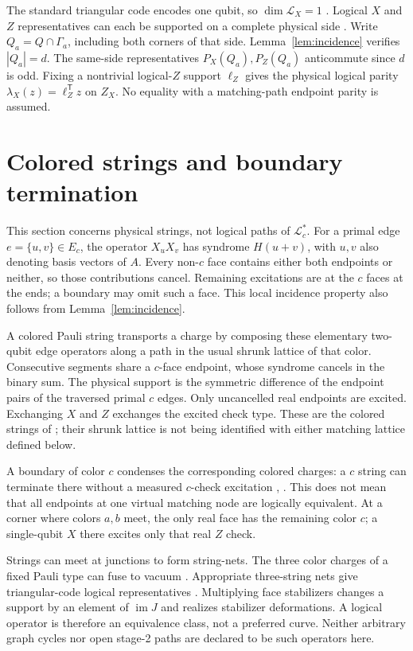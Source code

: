 \documentclass[11pt]{article}
\theoremstyle{definition}
\theoremstyle{plain}
\theoremstyle{remark}
\newcommand{\LL}{\mathcal L}
\begin{document}
The standard triangular code encodes one qubit, so $\dim\LL_X=1$
\cite[triangular-code construction, pp.~2--3]{Bombin}.
Logical $X$ and $Z$ representatives can each be supported on a complete
physical side \cite[Sec.~2.1, p.~4]{Lee}.
Write $Q_a=Q\cap\Gamma_a$, including both corners of that side.
Lemma~\ref{lem:incidence} verifies $|Q_a|=d$.
The same-side representatives $P_X(Q_a),P_Z(Q_a)$ anticommute since
$d$ is odd. Fixing a nontrivial logical-$Z$ support $\ell_Z$ gives
the physical logical parity $\lambda_X(z)=\ell_Z^{\mathsf T}z$ on
$Z_X$. No equality with a matching-path endpoint parity is assumed.

\section{Colored strings and boundary termination}\label{sec:strings}
This section concerns physical strings, not logical paths of $\LL_c^*$.
For a primal edge $e=\{u,v\}\in E_c$, the operator $X_uX_v$ has syndrome
$H(u+v)$, with $u,v$ also denoting basis vectors of $A$.
Every non-$c$ face contains either both endpoints or neither, so those
contributions cancel. Remaining excitations are at the $c$ faces at the
ends; a boundary may omit such a face. This local incidence property
also follows from Lemma~\ref{lem:incidence}.

A colored Pauli string transports a charge by composing these elementary
two-qubit edge operators along a path in the usual shrunk lattice of that
color. Consecutive segments share a $c$-face endpoint, whose syndrome
cancels in the binary sum. The physical support is the symmetric
difference of the endpoint pairs of the traversed primal $c$ edges.
Only uncancelled real endpoints are excited. Exchanging $X$ and $Z$
exchanges the excited check type. These are the colored strings of
\cite[Eq.~(4), pp.~2--3]{Bombin}; their shrunk lattice is not being
identified with either matching lattice defined below.

A boundary of color $c$ condenses the corresponding colored charges:
a $c$ string can terminate there without a measured $c$-check excitation
\cite[boundary discussion, p.~3]{Bombin},
\cite[Secs.~4.2--4.3, Fig.~6 and Table~2]{Kesselring}.
This does not mean that all endpoints at one virtual matching node are
logically equivalent. At a corner where colors $a,b$ meet, the only real
face has the remaining color $c$; a single-qubit $X$ there excites only
that real $Z$ check.

Strings can meet at junctions to form string-nets. The three color charges
of a fixed Pauli type can fuse to vacuum
\cite[Secs.~3.3--3.4]{Kesselring}.
Appropriate three-string nets give triangular-code logical representatives
\cite[Eqs.~(5)--(6), Fig.~3]{Bombin}.
Multiplying face stabilizers changes a support by an element of
$\operatorname{im}J$ and realizes stabilizer deformations. A logical
operator is therefore an equivalence class, not a preferred curve.
Neither arbitrary graph cycles nor open stage-2 paths are declared to be
such operators here.
\end{document}
